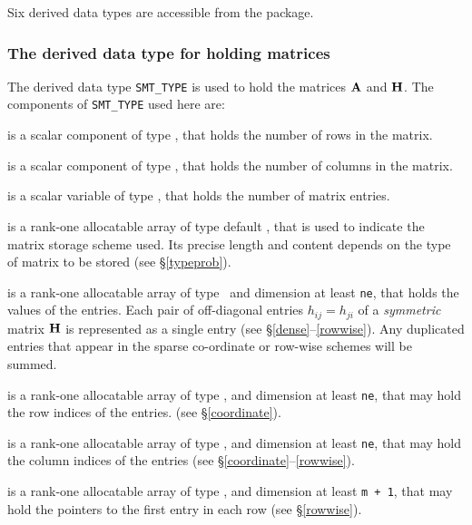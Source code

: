 \documentclass{galahad}
\begin{document}






\galtypes
Six derived data types are accessible from the package.


\subsubsection{The derived data type for holding matrices}\label{typesmt}
The derived data type {\tt SMT\_TYPE} is used to hold the matrices ${\mathbf{A}}$
and ${\mathbf{H}}$. The components of {\tt SMT\_TYPE} used here are:

\begin{description}

 is a scalar component of type \integer, 
that holds the number of rows in the matrix. 
 
 is a scalar component of type \integer, 
that holds the number of columns in the matrix. 
 
 is a scalar variable of type \integer, that
holds the number of matrix entries.

 is a rank-one allocatable array of type default \character, that
is used to indicate the matrix storage scheme used. Its precise length and
content depends on the type of matrix to be stored (see \S\ref{typeprob}).

 is a rank-one allocatable array of type \realdp\, 
and dimension at least {\tt ne}, that holds the values of the entries. 
Each pair of off-diagonal entries $h_{ij} = h_{ji}$ of a {\em symmetric}
matrix ${\mathbf{H}}$ is represented as a single entry 
(see \S\ref{dense}--\ref{rowwise}).
Any duplicated entries that appear in the sparse 
co-ordinate or row-wise schemes will be summed. 

 is a rank-one allocatable array of type \integer, 
and dimension at least {\tt ne}, that may hold the row indices of the entries. 
(see \S\ref{coordinate}).

 is a rank-one allocatable array of type \integer, 
and dimension at least {\tt ne}, that may hold the column indices of the entries
(see \S\ref{coordinate}--\ref{rowwise}).

 is a rank-one allocatable array of type \integer, 
and dimension at least {\tt m + 1}, that may hold the pointers to
the first entry in each row (see \S\ref{rowwise}).

\end{description}
\end{document}

